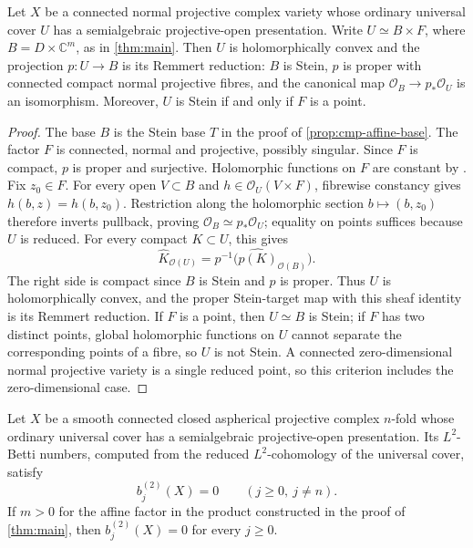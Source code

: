 \documentclass[11pt,a4paper]{amsart}
\begin{document}
\begin{corollary}
\label{cor:remmert-semialgebraic}
Let $X$ be a connected normal projective complex variety whose ordinary universal cover $U$ has a semialgebraic projective-open presentation. Write $U\simeq B\times F$, where $B=D\times\mathbb{C}^m$, as in \cref{thm:main}. Then $U$ is holomorphically convex and the projection $p:U\to B$ is its Remmert reduction: $B$ is Stein, $p$ is proper with connected compact normal projective fibres, and the canonical map $\mathcal{O}_B\to p_*\mathcal{O}_U$ is an isomorphism. Moreover, $U$ is Stein if and only if $F$ is a point.
\end{corollary}

\begin{proof}
The base $B$ is the Stein base $T$ in the proof of \cref{prop:cmp-affine-base}. The factor $F$ is connected, normal and projective, possibly singular. Since $F$ is compact, $p$ is proper and surjective. Holomorphic functions on $F$ are constant by \cite[Corollary~II.5.8]{DemaillyCADG}. Fix $z_0\in F$. For every open $V\subset B$ and $h\in\mathcal{O}_U(V\times F)$, fibrewise constancy gives $h(b,z)=h(b,z_0)$. Restriction along the holomorphic section $b\mapsto(b,z_0)$ therefore inverts pullback, proving $\mathcal{O}_B\simeq p_*\mathcal{O}_U$; equality on points suffices because $U$ is reduced. For every compact $K\subset U$, this gives
\[
 \widehat K_{\mathcal{O}(U)}
   =p^{-1}\bigl(\widehat{p(K)}_{\mathcal{O}(B)}\bigr).
\]
The right side is compact since $B$ is Stein and $p$ is proper. Thus $U$ is holomorphically convex, and the proper Stein-target map with this sheaf identity is its Remmert reduction. If $F$ is a point, then $U\simeq B$ is Stein; if $F$ has two distinct points, global holomorphic functions on $U$ cannot separate the corresponding points of a fibre, so $U$ is not Stein. A connected zero-dimensional normal projective variety is a single reduced point, so this criterion includes the zero-dimensional case.
\end{proof}

\begin{corollary}
\label{cor:singer-semialgebraic}
Let $X$ be a smooth connected closed aspherical projective complex $n$-fold whose ordinary universal cover has a semialgebraic projective-open presentation. Its $L^2$-Betti numbers, computed from the reduced $L^2$-cohomology of the universal cover, satisfy
\[
                 b_j^{(2)}(X)=0\qquad(j\geq0,\ j\ne n).
\]
If $m>0$ for the affine factor in the product constructed in the proof of \cref{thm:main}, then $b_j^{(2)}(X)=0$ for every $j\geq0$.
\end{corollary}
\end{document}
